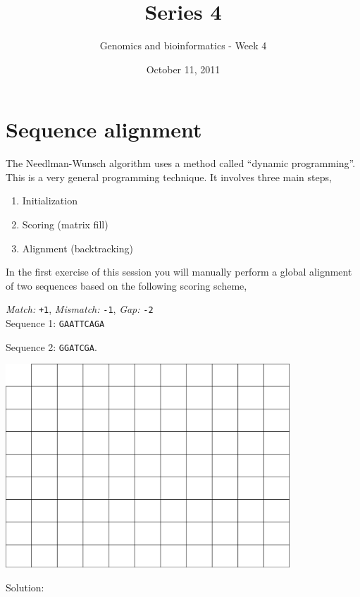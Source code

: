 \documentclass[a4paper,11pt]{article}
\title{Series 4}
\date{October 11, 2011}
\author{Genomics and bioinformatics - Week 4}
\begin{document}
\maketitle

\section{Sequence alignment}
The Needlman-Wunsch algorithm uses a method called ``dynamic programming''. This is a very general programming technique. It involves three main steps,
\begin{enumerate}
\item Initialization
\item Scoring (matrix fill)
\item Alignment (backtracking)
\end{enumerate}

In the first exercise of this session you will manually perform a global alignment of two sequences based on the following scoring scheme,

\emph{Match:}  \texttt{+1}, \emph{Mismatch:} \texttt{-1}, \emph{Gap:} \texttt{-2}\\

Sequence 1: \texttt{GAATTCAGA}

Sequence 2: \texttt{GGATCGA}.

\begin{center}
\includegraphics[width=0.8\textwidth]{matrix.png}
\end{center}

Solution:
\end{document}
